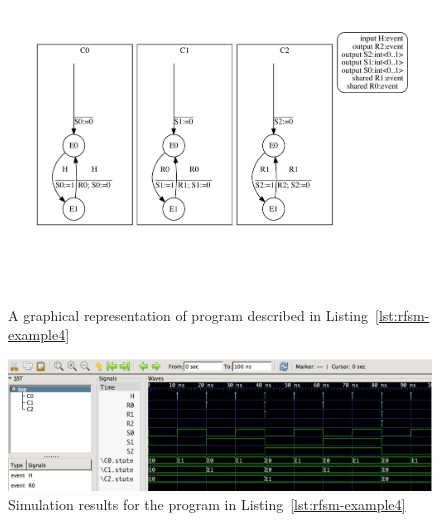 \begin{figure}[h]
   \includegraphics[height=9cm]{figs/ctrmod8-top}
   \centering
  \caption{A graphical representation of program described in Listing~\ref{lst:rfsm-example4}}
  \label{fig:rfsm-example4-top}
\end{figure}

\begin{figure}[h]
   \includegraphics[width=\textwidth]{figs/ctrmod8-chrono}
   \centering
  \caption{Simulation results for the program in Listing~\ref{lst:rfsm-example4}}
  \label{fig:rfsm-example4-vcd}
\end{figure}

